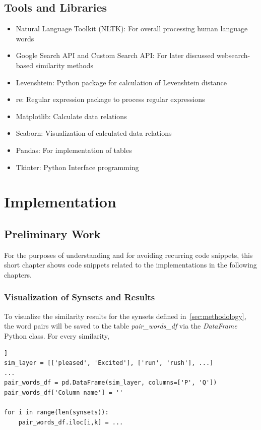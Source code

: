 \documentclass[conference]{IEEEtran}
\begin{document}
\subsection{Tools and Libraries}
\begin{itemize}
\item Natural Language Toolkit (NLTK): For overall processing human language words
\item Google Search API and Custom Search API: For later discussed websearch-based similarity methods
\item Levenshtein: Python package for calculation of Levenshtein distance
\item re: Regular expression package to process regular expressions
\item Matplotlib: Calculate data relations
\item Seaborn: Visualization of calculated data relations
\item Pandas: For implementation of tables
\item Tkinter: Python Interface programming
\end{itemize}

\section{Implementation}\label{sec:implementation}

\subsection{Preliminary Work}
For the purposes of understanding and for avoiding recurring code snippets, this short chapter shows code snippets related to the implementations in the following chapters.

\subsubsection{Visualization of Synsets and Results}

To visualize the similarity results for the synsets defined in~\ref{sec:methodology}, the word pairs will be saved to the table \textit{pair\_words\_df} via the \textit{DataFrame} Python class. For every similarity, 

\begin{lstlisting}[frame=single, label=lst:table, caption={}, captionpos=b]]
sim_layer = [['pleased', 'Excited'], ['run', 'rush'], ...]
...
pair_words_df = pd.DataFrame(sim_layer, columns=['P', 'Q'])
pair_words_df['Column name'] = ''

for i in range(len(synsets)):
    pair_words_df.iloc[i,k] = ...
\end{lstlisting}
\end{document}
